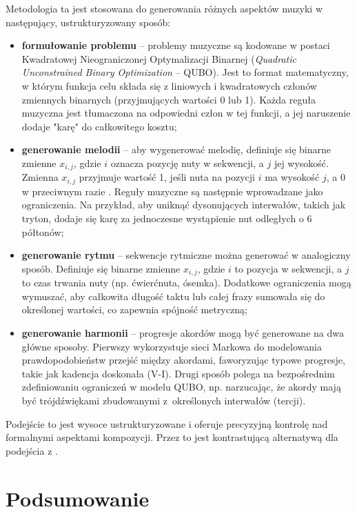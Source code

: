 Metodologia ta jest stosowana do generowania różnych aspektów muzyki w następujący, ustrukturyzowany sposób:
\begin{itemize}
    \item \textbf{formułowanie problemu} -- problemy muzyczne są kodowane w postaci Kwadratowej Nieograniczonej Optymalizacji Binarnej (\textit{Quadratic Unconstrained Binary Optimization} -- QUBO). Jest to format matematyczny, w którym funkcja celu składa się z liniowych i kwadratowych członów zmiennych binarnych (przyjmujących wartości 0 lub 1). Każda reguła muzyczna jest tłumaczona na odpowiedni człon w tej funkcji, a jej naruszenie dodaje "karę" do całkowitego kosztu;

    \item \textbf{generowanie melodii} -- aby wygenerować melodię, definiuje się binarne zmienne $ x_{i,j} $, gdzie $i$ oznacza pozycję nuty w sekwencji, a $j$ jej wysokość. Zmienna $ x_{i,j} $ przyjmuje wartość 1, jeśli nuta na pozycji $i$ ma wysokość $j$, a 0 w przeciwnym razie \cite{glover2019quantum}. Reguły muzyczne są następnie wprowadzane jako ograniczenia. Na przykład, aby uniknąć dysonujących interwałów, takich jak tryton, dodaje się karę za jednoczesne wystąpienie nut odległych o 6 półtonów;

    \item \textbf{generowanie rytmu} -- sekwencje rytmiczne można generować w analogiczny sposób. Definiuje się binarne zmienne $ x_{i,j} $, gdzie $i$ to pozycja w sekwencji, a $j$ to czas trwania nuty (np. ćwierćnuta, ósemka). Dodatkowe ograniczenia mogą wymuszać, aby całkowita długość taktu lub całej frazy sumowała się do określonej wartości, co zapewnia spójność metryczną;

    \item \textbf{generowanie harmonii} -- progresje akordów mogą być generowane na dwa główne sposoby. Pierwszy wykorzystuje sieci Markowa do modelowania prawdopodobieństw przejść między akordami, faworyzując typowe progresje, takie jak kadencja doskonała (V-I). Drugi sposób polega na bezpośrednim zdefiniowaniu ograniczeń w modelu QUBO, np. narzucając, że akordy mają być trójdźwiękami zbudowanymi z~określonych interwałów (tercji).
\end{itemize}

Podejście to jest wysoce ustrukturyzowane i oferuje precyzyjną kontrolę nad formalnymi aspektami kompozycji. Przez to jest kontrastującą alternatywą dla podejścia z \cite{miranda2022quantum}.

\section{Podsumowanie}

